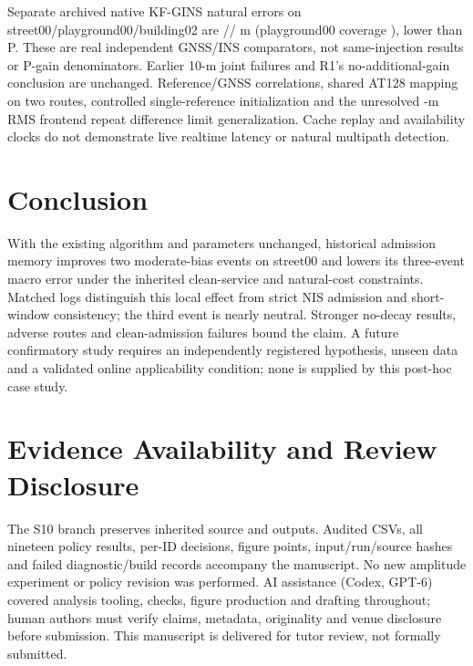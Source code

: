 \documentclass[conference]{IEEEtran}
\begin{document}
Separate archived native KF-GINS natural errors on street00/playground00/building02 are // m (playground00 coverage ), lower than P. These are real independent GNSS/INS comparators, not same-injection results or P-gain denominators. Earlier 10-m joint failures and R1's no-additional-gain conclusion are unchanged. Reference/GNSS correlations, shared AT128 mapping on two routes, controlled single-reference initialization and the unresolved -m RMS frontend repeat difference limit generalization. Cache replay and availability clocks do not demonstrate live realtime latency or natural multipath detection.

\section{Conclusion}
With the existing algorithm and parameters unchanged, historical admission memory improves two moderate-bias events on street00 and lowers its three-event macro error under the inherited clean-service and natural-cost constraints. Matched logs distinguish this local effect from strict NIS admission and short-window consistency; the third event is nearly neutral. Stronger no-decay results, adverse routes and clean-admission failures bound the claim. A future confirmatory study requires an independently registered hypothesis, unseen data and a validated online applicability condition; none is supplied by this post-hoc case study.

\section*{Evidence Availability and Review Disclosure}
The S10 branch preserves inherited source and outputs. Audited CSVs, all nineteen policy results, per-ID decisions, figure points, input/run/source hashes and failed diagnostic/build records accompany the manuscript. No new amplitude experiment or policy revision was performed. AI assistance (Codex, GPT-6) covered analysis tooling, checks, figure production and drafting throughout; human authors must verify claims, metadata, originality and venue disclosure before submission. This manuscript is delivered for tutor review, not formally submitted.


\end{document}

